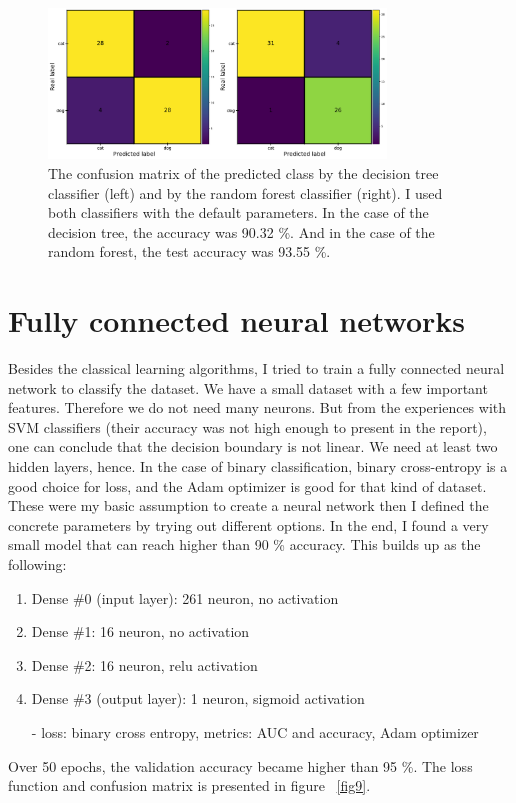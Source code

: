\documentclass[12pt a4paper]{article}
\numberwithin{equation}{section}
\begin{document}
\begin{figure}[H]
\centering
\includegraphics[width=0.8\textwidth]{fig/conf1.pdf}
\caption{The confusion matrix of the predicted class by the decision tree classifier (left) and by the random forest classifier (right). I used both classifiers with the default parameters.   In the case of the decision tree, the accuracy was 90.32 \%. And in the case of the random forest, the test accuracy was 93.55 \%.}
\label{fig8}
\end{figure}

\section{Fully connected neural networks}

Besides the classical learning algorithms, I tried to train a fully connected neural network to classify the dataset. We have a small dataset with a few important features. Therefore we do not need many neurons.  But from the experiences with SVM classifiers (their accuracy was not high enough to present in the report), one can conclude that the decision boundary is not linear.  We need at least two hidden layers, hence. In the case of binary classification, binary cross-entropy is a good choice for loss, and the Adam optimizer is good for that kind of dataset. These were my basic assumption to create a neural network then I defined the concrete parameters by trying out different options. In the end, I found a very small model that can reach higher than 90 \% accuracy.  This builds up as the following:
\begin{enumerate}
\item Dense \#0 (input layer): 261 neuron, no activation
\item Dense \#1: 16 neuron, no activation
\item Dense \#2: 16 neuron, relu activation
\item Dense \#3 (output layer): 1 neuron, sigmoid activation
\item[-]  loss: binary cross entropy, metrics: AUC and accuracy, Adam optimizer
\end{enumerate}
Over 50 epochs, the validation accuracy became higher than 95 \%. The loss function and confusion matrix is presented in figure ~\ref{fig9}.
\end{document}
